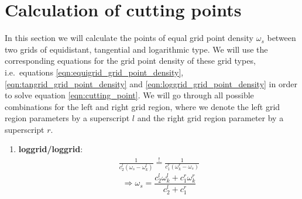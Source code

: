 \section{Calculation of cutting points}\label{sec:app_cutting_points}
In this section we will calculate the points of equal grid point density $\omega_s$ between two grids of equidistant, tangential and logarithmic type. We will use the corresponding equations for the grid point density of these grid types, i.e.~equations \ref{eqn:equigrid_grid_point_density}, \ref{eqn:tangrid_grid_point_density} and \ref{eqn:loggrid_grid_point_density} in order to solve equation \ref{eqn:cutting_point}. We will go through all possible combinations for the left and right grid region, where we denote the left grid region parameters by a superscript $l$ and the right grid region parameter by a superscript $r$.
\begin{enumerate}
	\item {\bf loggrid/loggrid}:
		\begin{align*}
			\frac{1}{c_2^l(\omega_s-\omega_k^l)}\stackrel{!}{=}\frac{1}{c_1^r(\omega_k^r-\omega_s)}
		\end{align*}
		\[
		 	\Rightarrow \boxed{\omega_s=\frac{c_2^l\omega_k^l + c_1^r\omega_k^r}{c_2^l+c_1^r}}
		\]


\end{enumerate}
